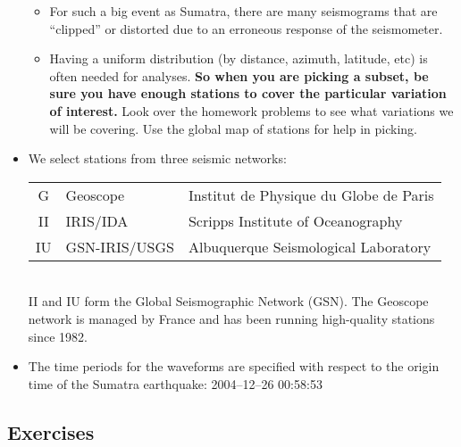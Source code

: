 \documentclass[11pt,titlepage,fleqn]{article}
\begin{document}
\begin{itemize}
\begin{itemize}
\item For such a big event as Sumatra, there are many seismograms that are ``clipped'' or distorted due to an erroneous response of the seismometer.

\item Having a uniform distribution (by distance, azimuth, latitude, etc) is often needed for analyses. {\bf So when you are picking a subset, be sure you have enough stations to cover the particular variation of interest.} Look over the homework problems to see what variations we will be covering. Use the global map of stations for help in picking.
\end{itemize}

\item We select stations from three seismic networks: \\

\begin{tabular}{cll}
\hline
G   & Geoscope      & Institut de Physique du Globe de Paris \\
II  & IRIS/IDA      & Scripps Institute of Oceanography \\
IU  & GSN-IRIS/USGS & Albuquerque Seismological Laboratory \\
\hline
\end{tabular} \\

\noindent
II and IU form the Global Seismographic Network (GSN).
The Geoscope network is managed by France and has been running high-quality stations since 1982.

\item The time periods for the waveforms are specified with respect to the origin time of the Sumatra earthquake: 2004--12--26 00:58:53


\end{itemize}


\subsection*{Exercises}
\end{document}
